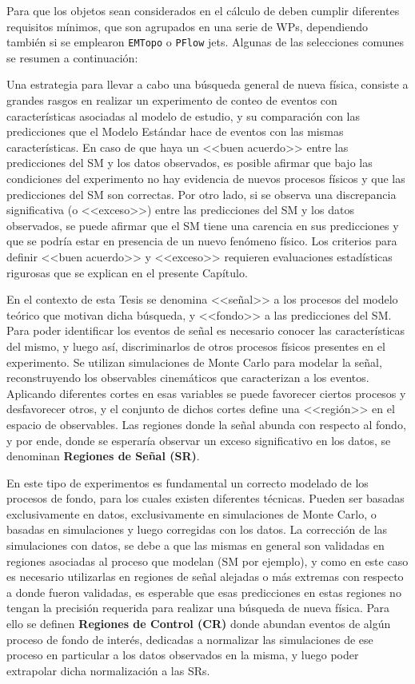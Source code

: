 Para que los objetos sean considerados en el cálculo de \met deben cumplir diferentes requisitos mínimos, que son agrupados en una serie de WPs, dependiendo también si se emplearon \texttt{EMTopo} o \texttt{PFlow} jets. Algunas de las selecciones comunes se resumen a continuación:



Una estrategia para llevar a cabo una búsqueda general de nueva física, consiste a grandes rasgos en realizar un experimento de conteo de eventos con características asociadas al modelo de estudio, y su comparación con las predicciones que el Modelo Estándar hace de eventos con las mismas características. En caso de que haya un <<buen acuerdo>> entre las predicciones del SM y los datos observados, es posible afirmar que bajo las condiciones del experimento no hay evidencia de nuevos procesos físicos y que las predicciones del SM son correctas. 
Por otro lado, si se observa una discrepancia significativa (o <<exceso>>) entre las predicciones del SM y
los datos observados, se puede afirmar que el SM tiene una carencia en sus predicciones y que se podría estar en presencia de un nuevo fenómeno físico. Los criterios para definir <<buen acuerdo>> y <<exceso>> requieren evaluaciones estadísticas rigurosas que se explican en el presente Capítulo. 


En el contexto de esta Tesis se denomina <<señal>> a los procesos del modelo teórico que motivan dicha búsqueda, y <<fondo>> a las predicciones del SM. Para poder identificar los eventos de señal es necesario conocer las características del mismo, y luego así, discriminarlos de otros procesos físicos presentes en el experimento. Se utilizan simulaciones de Monte Carlo para modelar la señal, reconstruyendo los observables cinemáticos que caracterizan a los eventos. Aplicando diferentes cortes en esas variables se puede favorecer ciertos procesos y desfavorecer otros, y el conjunto de dichos cortes define una <<región>> en el espacio de observables. Las regiones donde la señal abunda con respecto al fondo, y por ende, donde se esperaría observar un exceso significativo en los datos, se denominan \textbf{Regiones de Señal (SR)}.

En este tipo de experimentos es fundamental un correcto modelado de los procesos de fondo,  para los cuales existen diferentes técnicas. Pueden ser basadas exclusivamente en datos, exclusivamente en simulaciones de Monte Carlo, o basadas en simulaciones y  luego corregidas con los datos. La corrección de las simulaciones con datos, se debe a que las mismas en general son validadas en regiones asociadas al proceso que modelan (SM por ejemplo), y como en este caso es necesario utilizarlas en regiones de señal alejadas o más extremas con respecto a donde fueron validadas, es esperable que esas predicciones en estas regiones no tengan la precisión requerida para realizar una búsqueda de nueva física. Para ello se definen \textbf{Regiones de Control (CR)} donde abundan eventos de algún proceso de fondo de interés, dedicadas a normalizar las simulaciones de ese proceso en particular a los datos observados en la misma, y luego poder extrapolar dicha normalización a las SRs.

